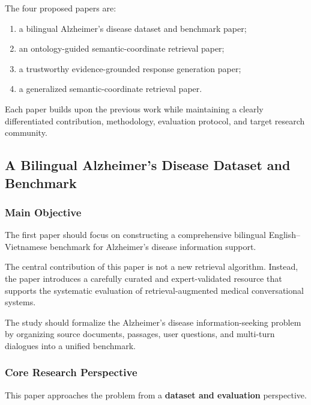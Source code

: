\documentclass{article}
\begin{document}
The four proposed papers are:
\begin{enumerate}
    \item a bilingual Alzheimer's disease dataset and benchmark paper;
    \item an ontology-guided semantic-coordinate retrieval paper;
    \item a trustworthy evidence-grounded response generation paper;
    \item a generalized semantic-coordinate retrieval paper.
\end{enumerate}
Each paper builds upon the previous work while maintaining a clearly differentiated contribution, methodology, evaluation protocol, and target research community.

\subsection{A Bilingual Alzheimer's Disease Dataset and Benchmark}



\subsubsection{Main Objective}

The first paper should focus on constructing a comprehensive bilingual
English--Vietnamese benchmark for Alzheimer's disease information support.

The central contribution of this paper is not a new retrieval algorithm. Instead, the paper introduces a carefully curated and expert-validated resource that supports the systematic evaluation of retrieval-augmented medical conversational systems.

The study should formalize the Alzheimer's disease information-seeking problem by organizing source documents, passages, user questions, and multi-turn dialogues into a unified benchmark.

\subsubsection{Core Research Perspective}

This paper approaches the problem from a \textbf{dataset and evaluation} perspective.
\end{document}

